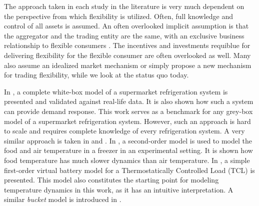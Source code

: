 The approach taken in each study in the literature is very much dependent on the perspective from which flexibility is utilized. Often, full knowledge and control of all assets is assumed. An often overlooked implicit assumption is that the aggregator and the trading entity are the same, with an exclusive business relationship to flexible consumers \cite{gade2022ecosystem}. The incentives and investments requiblue for delivering flexibility for the flexible consumer are often overlooked as well. Many also assume an idealized market mechanism or simply propose a new mechanism for trading flexibility, while we look at the status quo today.

In \cite{shafiei2013modeling}, a complete white-box model of a supermarket refrigeration system is presented and validated against real-life data. It is also shown how such a system can provide demand response. This work serves as a  benchmark for any grey-box model of a supermarket refrigeration system. However, such an approach is hard to scale and requires complete knowledge of every refrigeration system. A very similar approach is taken in \cite{petersen2012eso2} and \cite{pedersen2013direct}. In \cite{pedersen2016improving}, a second-order model is used to model the food and air temperature in a freezer in an experimental setting. It is shown how food temperature has much slower dynamics than air temperature. In \cite{hao2014aggregate}, a simple first-order virtual battery model for a Thermostatically Controlled Load (TCL) is presented. This model also constitutes the starting point for modeling temperature dynamics in this work, as it has an intuitive interpretation. A similar \textit{bucket} model is introduced in \cite{petersen2013taxonomy}.


